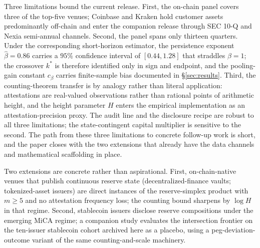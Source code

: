 \documentclass[12pt]{article}
\theoremstyle{sampledef}
\theoremstyle{sampleplain}
\theoremstyle{sampleremark}
\newcommand{\1}{\mathbf{1}}
\begin{document}
Three limitations bound the current release. First, the on-chain
panel covers three of the top-five venues; Coinbase and Kraken hold
customer assets predominantly off-chain and enter the companion
release through SEC 10-Q and Nexia semi-annual channels. Second, the
panel spans only thirteen quarters. Under the corresponding
short-horizon estimator, the persistence exponent $\hat\beta = 0.86$
carries a $95\%$ confidence interval of $[0.44, 1.28]$ that straddles
$\beta = 1$; the crossover $k^\ast$ is therefore identified only in
sign and endpoint, and the pooling-gain constant $c_\beta$ carries
finite-sample bias documented in \S\ref{sec:results}. Third, the
counting-theorem transfer is by analogy rather than literal
application: attestations are real-valued observations rather than
rational points of arithmetic height, and the height parameter $H$
enters the empirical implementation as an attestation-precision
proxy. The audit line and the disclosure recipe are robust to all
three limitations; the state-contingent capital multiplier is
sensitive to the second. The path from these three limitations to
concrete follow-up work is short, and the paper closes with the
two extensions that already have the data channels and mathematical
scaffolding in place.

Two extensions are concrete rather than aspirational. First,
on-chain-native venues that publish continuous reserve state
(decentralized-finance vaults; tokenized-asset issuers) are direct
instances of the reserve-simplex product with $m \ge 5$ and no
attestation frequency loss; the counting bound sharpens by $\log H$
in that regime. Second, stablecoin issuers disclose reserve
compositions under the emerging MiCA regime; a companion study
evaluates the intersection frontier on the ten-issuer stablecoin
cohort archived here as a placebo, using a peg-deviation-outcome
variant of the same counting-and-scale machinery.




\appendix
\setcounter{figure}{0}
\setcounter{table}{0}
\renewcommand{\thefigure}{A.\arabic{figure}}
\renewcommand{\thetable}{A.\arabic{table}}
\end{document}
